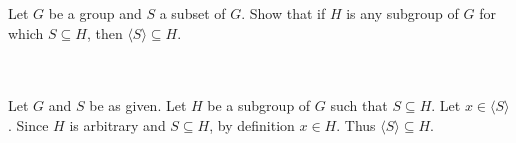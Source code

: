 Let $G$ be a group and $S$ a subset of $G$. Show that if $H$ is any subgroup of $G$ for which
$S\subseteq H$, then $\langle S\rangle\subseteq H$.\\\\

\begin{solution}\renewcommand{\qedsymbol}{}\ \\
    Let $G$ and $S$ be as given. Let $H$ be a subgroup of $G$ such that $S\subseteq H$. Let
    $x\in\langle S\rangle$. Since $H$ is arbitrary and $S\subseteq H$, by definition $x\in H$. Thus
    $\langle S\rangle\subseteq H$.

\end{solution}